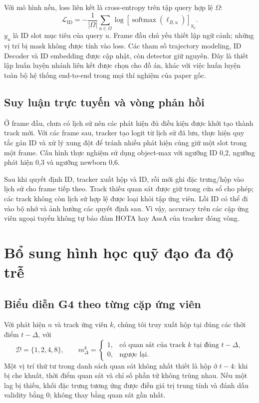 Với mô hình nền, loss liên kết là cross-entropy trên tập query hợp lệ $\Omega$:
\begin{equation}
 \mathcal L_{\mathrm{ID}}=
 -\frac{1}{|\Omega|}\sum_{u\in\Omega}
 \log\left[\operatorname{softmax}(\boldsymbol\ell_{B,u})\right]_{y_u}.
 \label{eq:baseline-loss}
\end{equation}
$y_u$ là ID slot mục tiêu của query $u$. Frame đầu chủ yếu thiết lập ngữ cảnh;
những vị trí bị mask không được tính vào loss. Các tham số trajectory modeling,
ID Decoder và ID embedding được cập nhật, còn detector giữ nguyên. Đây là
thiết lập huấn luyện nhánh liên kết được chọn cho đồ án, khác với việc huấn luyện
toàn bộ hệ thống end-to-end trong mọi thí nghiệm của paper gốc.

\FloatBarrier
\subsection{Suy luận trực tuyến và vòng phản hồi}
Ở frame đầu, chưa có lịch sử nên các phát hiện đủ điều kiện được khởi tạo thành track mới. Với các frame sau, tracker tạo logit từ lịch sử đã lưu, thực hiện quy tắc gán ID và xử lý xung đột để tránh nhiều phát hiện cùng giữ một slot trong một frame. Cấu hình thực nghiệm sử dụng object-max với ngưỡng ID 0,2, ngưỡng phát hiện 0,3 và ngưỡng newborn 0,6.

Sau khi quyết định ID, tracker xuất hộp và ID, rồi mới ghi đặc trưng/hộp vào lịch sử cho frame tiếp theo. Track thiếu quan sát được giữ trong cửa sổ cho phép; các track không còn lịch sử hợp lệ được loại khỏi tập ứng viên. Lỗi ID có thể đi vào bộ nhớ và ảnh hưởng các quyết định sau. Vì vậy, accuracy trên các cặp ứng viên ngoại tuyến không tự bảo đảm HOTA hay AssA của tracker đóng vòng.

\FloatBarrier
\section{Bổ sung hình học quỹ đạo đa độ trễ}
\FloatBarrier
\subsection{Biểu diễn G4 theo từng cặp ứng viên}
Với phát hiện $n$ và track ứng viên $k$, chúng tôi truy xuất hộp tại đúng các
thời điểm $t-\Delta$, với
\begin{equation}
 \mathcal D=\{1,2,4,8\},\qquad
 m_{\Delta}^{k}=\begin{cases}
  1,&\text{có quan sát của track }k\text{ tại đúng }t-\Delta,\\
  0,&\text{ngược lại.}
 \end{cases}
 \label{eq:exact-lags}
\end{equation}
Một vị trí thứ tư trong danh sách quan sát không nhất thiết là hộp ở $t-4$:
khi bị che khuất, thời điểm quan sát và chỉ số phần tử không trùng nhau.
Nếu một lag bị thiếu, khối đặc trưng tương ứng được điền giá trị trung tính
và đánh dấu validity bằng $0$; không thay bằng quan sát gần nhất.

